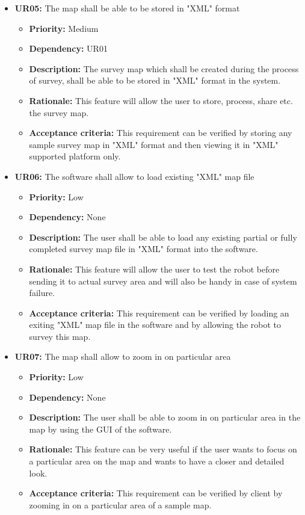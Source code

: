 \documentclass[10pt,a4paper,titlepage]{article}
\begin{document}
    \begin{itemize}
		\item \textbf{UR05:} The map shall be able to be stored in "XML" format
		\begin{itemize}
			\item \textbf{Priority:} Medium
            \item \textbf{Dependency:} UR01
			\item \textbf{Description:} The survey map which shall be created during the process of survey, shall be able to be stored in "XML" format in the system.  
            \item \textbf{Rationale:} This feature will allow the user to store, process, share etc. the survey map. 
            \item \textbf{Acceptance criteria:} This requirement can be verified by storing any sample survey map in "XML" format and then viewing it in "XML" supported platform only. 
		\end{itemize} 
	\end{itemize}
    \begin{itemize}
		\item \textbf{UR06:} The software shall allow to load existing "XML" map file
		\begin{itemize}
			\item \textbf{Priority:} Low
            \item \textbf{Dependency:} None
			\item \textbf{Description:} The user shall be able to load any existing partial or fully completed survey map file in "XML" format into the software. 
            \item \textbf{Rationale:} This feature will allow the user to test the robot before sending it to actual survey area and will also be handy in case of system failure. 
            \item \textbf{Acceptance criteria:} This requirement can be verified by loading an exiting "XML" map file in the software and by allowing the robot to survey this map.  
		\end{itemize} 
	\end{itemize}
    \begin{itemize}
		\item \textbf{UR07:} The map shall allow to zoom in on particular area
		\begin{itemize}
			\item \textbf{Priority:} Low
            \item \textbf{Dependency:} None
			\item \textbf{Description:} The user shall be able to zoom in on particular area in the map by using the GUI of the software.  
            \item \textbf{Rationale:} This feature can be very useful if the user wants to focus on a particular area on the map and wants to have a closer and detailed look.  
            \item \textbf{Acceptance criteria:} This requirement can be verified by client by zooming in on a particular area of a sample map.  
		\end{itemize} 
	\end{itemize}
    
\end{document}
